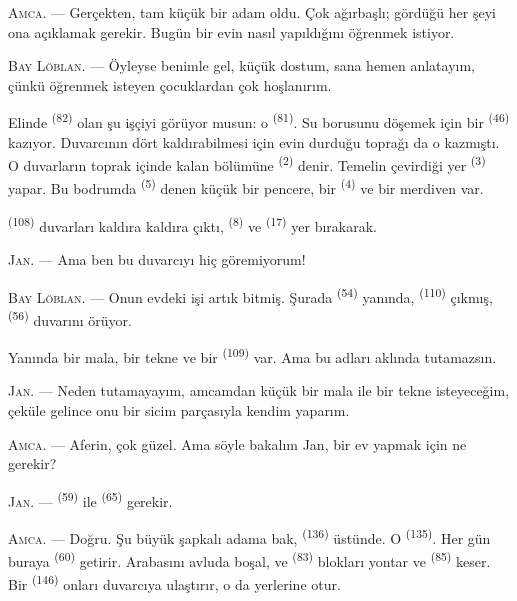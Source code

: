 \textsc{Amca}. --- Gerçekten, tam küçük bir adam oldu. Çok ağırbaşlı;
gördüğü her şeyi ona açıklamak gerekir. Bugün bir evin nasıl yapıldığını
öğrenmek istiyor.

\VUsaut{3.0mm}

\textsc{Bay Löblan}. --- Öyleyse benimle gel, küçük dostum, sana hemen
anlatayım, çünkü öğrenmek isteyen çocuklardan çok hoşlanırım.

Elinde  \textsuperscript{(82)} olan şu işçiyi görüyor musun:
o  \textsuperscript{(81)}. Su borusunu döşemek için bir
 \textsuperscript{(46)} kazıyor. Duvarcının dört
 kaldırabilmesi için evin durduğu toprağı da o kazmıştı. O
duvarların toprak içinde kalan bölümüne  \textsuperscript{(2)}
denir. Temelin çevirdiği yer  \textsuperscript{(3)} yapar. Bu
bodrumda  \textsuperscript{(5)} denen küçük bir
pencere, bir  \textsuperscript{(4)} ve bir merdiven var.

 \textsuperscript{(108)} duvarları kaldıra kaldıra çıktı,
 \textsuperscript{(8)} ve 
\textsuperscript{(17)} yer bırakarak.

\textsc{Jan}. --- Ama ben bu duvarcıyı hiç göremiyorum!

\textsc{Bay Löblan}. --- Onun evdeki işi artık bitmiş. Şurada
 \textsuperscript{(54)} yanında, 
\textsuperscript{(110)} çıkmış, 
\textsuperscript{(56)} duvarını örüyor.

Yanında bir mala, bir tekne ve bir  \textsuperscript{(109)}
var. Ama bu adları aklında tutamazsın.

\textsc{Jan}. --- Neden tutamayayım, amcamdan küçük bir mala ile bir tekne
isteyeceğim, çeküle gelince onu bir sicim parçasıyla kendim yaparım.

\VUsaut{3.0mm}
\VUsaut{3.0mm}

\textsc{Amca}. --- Aferin, çok güzel. Ama söyle bakalım Jan, bir ev yapmak
için ne gerekir?

\textsc{Jan}. ---  \textsuperscript{(59)} ile
 \textsuperscript{(65)} gerekir.

\textsc{Amca}. --- Doğru. Şu büyük şapkalı adama bak, 
\textsuperscript{(136)} üstünde. O 
\textsuperscript{(135)}. Her gün buraya 
\textsuperscript{(60)} getirir. Arabasını avluda boşal, ve
 \textsuperscript{(83)} blokları yontar ve
 \textsuperscript{(85)} keser. Bir 
\textsuperscript{(146)} onları duvarcıya ulaştırır, o da yerlerine otur.


